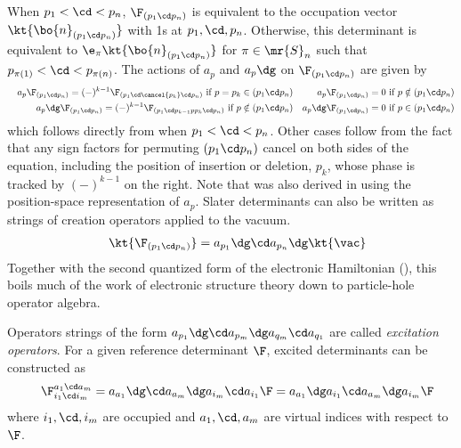 \documentclass[11pt,fleqn]{article}
\numberwithin{equation}{section}
\begin{document}
\begin{rmk}
When $p_1<\cd<p_n$, $\F_{(p_1\cd p_n)}$ is equivalent to the occupation vector $\kt{\bo{n}_{(p_1\cd p_n)}}$ with 1s at $p_1,\cd,p_n$.
Otherwise, this determinant is equivalent to $\e_{\pi}\kt{\bo{n}_{(p_1\cd p_n)}}$ for $\pi\in\mr{S}_n$ such that $p_{\pi(1)}<\cd<p_{\pi(n)}$.
The actions of $a_p$ and $a_p\dg$ on $\F_{(p_1\cd p_n)}$ are given by
\begin{align}
&&\label{abstract-annihilation-operator-action}
  a_p\F_{(p_1\cd p_n)}
=
  (-)^{k-1}\F_{(p_1\cd\cancel{p_k}\cd p_n)}
  \ \text{if $p=p_k\in(p_1\cd p_n)$}
&&
  a_p\F_{(p_1\cd p_n)}
=
  0
  \ \text{if $p\notin(p_1\cd p_n)$}
\\\label{abstract-creation-operator-action}
&&
  a_p\dg\F_{(p_1\cd p_n)}
=
  (-)^{k-1}\F_{(p_1\cd p_{k-1}pp_k\cd p_n)}
  \ \text{if $p\notin(p_1\cd p_n)$}
&&
  a_p\dg\F_{(p_1\cd p_n)}
=
  0
  \ \text{if $p\in(p_1\cd p_n)$}
\end{align}
which follows directly from  when $p_1<\cd<p_n$.
Other cases follow from the fact that any sign factors for permuting $(p_1\cd p_n)$ cancel on both sides of the equation, including the position of insertion or deletion, $p_k$, whose phase is tracked by $(-)^{k-1}$ on the right.
Note that  was also derived in  using the position-space representation of $a_p$.
Slater determinants can also be written as strings of creation operators applied to the vacuum.
\begin{align}
&&
  \kt{\F_{(p_1\cd p_n)}}
=
  a_{p_1}\dg\cd a_{p_n}\dg\kt{\vac}
\end{align}
Together with the second quantized form of the electronic Hamiltonian (), this boils much of the work of electronic structure theory down to particle-hole operator algebra.
\end{rmk}

\begin{dfn}
Operators strings of the form $a_{p_1}\dg\cd a_{p_m}\dg a_{q_m}\cd a_{q_1}$ are called \textit{excitation operators}.
For a given reference determinant $\F$, excited determinants can be constructed as
\begin{align}
&&
  \F_{i_1\cd i_m}^{a_1\cd a_m}
=
  a_{a_1}\dg\cd a_{a_m}\dg a_{i_m}\cd a_{i_1}\F
=
  a_{a_1}\dg a_{i_1}\cd a_{a_m}\dg a_{i_m}\F
\end{align}
where $i_1,\cd,i_m$ are occupied and $a_1,\cd,a_m$ are virtual indices with respect to $\F$.
\end{dfn}
\end{document}
